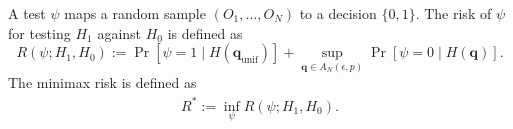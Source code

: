 \documentclass[11pt]{article}
\numberwithin{equation}{section}
\newcommand{\unif}{\mathrm{unif}}
\newcommand{\Pois}{\mathrm{Poi}}
\newcommand{\Prp}[1]{\Pr\left[#1 \right]}
\begin{document}
A test $\psi$ maps a random sample $(O_1,\ldots,O_N)$ to a decision $\{0,1\}$. The risk of $\psi$ for testing $H_1$ against $H_0$ is defined as
\[
R(\psi; H_1, H_0) := \Prp{\psi = 1 \mid H(\mathbf{q}_{\unif})}  + \sup_{\mathbf{q} \in A_N(\epsilon,p)} \Prp{\psi = 0 \mid H(\mathbf{q})}. 
\]
The minimax risk is defined as
\begin{align}
\label{eq:minimax_def}
    R^* := \inf_{\psi} R(\psi; H_1, H_0).
\end{align}

\end{document}
